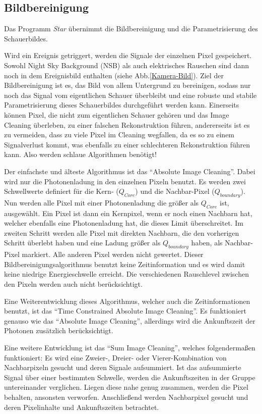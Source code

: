 \subsection{Bildbereinigung}
Das Programm \textit{Star} übernimmt die Bildbereinigung und die Parametrisierung des Schauerbildes.

Wird ein Ereignis getriggert, werden die Signale der einzelnen Pixel gespeichert.
Sowohl Night Sky Background (NSB) als auch elektrisches Rauschen sind dann noch in dem Ereignisbild enthalten (siehe Abb.\ref{Kamera-Bild}).
Ziel der Bildbereinigung ist es, das Bild von allem Untergrund zu bereinigen, sodass nur noch das Signal vom eigentlichen Schauer überbleibt und eine robuste und stabile Parametrisierung dieses Schauerbildes durchgeführt werden kann.
Einerseits können Pixel, die nicht zum eigentlichen Schauer gehören und das Image Cleaning überleben, zu einer falschen Rekonstruktion führen, andererseits ist es zu vermeiden, dass zu viele Pixel im Cleaning wegfallen, da es so zu einem Signalverlust kommt, was ebenfalls zu einer schlechteren Rekonstruktion führen kann.
Also werden schlaue Algorithmen benötigt! 

Der einfachste und älteste Algorithmus ist das ``Absolute Image Cleaning''.
Dabei wird nur die Photonenladung in den einzelnen Pixeln benutzt.
Es werden zwei Schwellwerte definiert für die Kern- ($Q_{Core}$) und die Nachbar-Pixel ($Q_{boundary}$).
Nun werden alle Pixel mit einer Photonenladung die größer als $Q_{Core}$ ist, ausgewählt.
Ein Pixel ist dann ein Kernpixel, wenn er noch einen Nachbarn hat, welcher ebenfalls eine Photonenladung hat, die dieses Limit überschreitet.
Im zweiten Schritt werden alle Pixel mit direkten Nachbarn, die den vorherigen Schritt überlebt haben und eine Ladung größer als $Q_{boundary}$ haben, als Nachbar-Pixel markiert.
Alle anderen Pixel werden nicht gewertet.
Dieser Bildbereinigungsalgorithmus benutzt keine Zeitinformation und es wird damit keine niedrige Energieschwelle erreicht. 
Die verschiedenen Rauschlevel zwischen den Pixeln werden auch nicht berücksichtigt.

Eine Weiterentwicklung dieses Algorithmus, welcher auch die Zeitinformationen benutzt, ist das ``Time Constrained Absolute Image Cleaning''. 
Es funktioniert genauso wie das ``Absolute Image Cleaning'', allerdings wird die Ankunftszeit der Photonen zusätzlich berücksichtigt.

Eine weitere Entwicklung ist das ``Sum Image Cleaning'', welches folgendermaßen funktioniert:
Es wird eine Zweier-, Dreier- oder Vierer-Kombination von Nachbarpixeln gesucht und deren Signale aufsummiert.
Ist das aufsummierte Signal über einer bestimmten Schwelle, werden die Ankunftszeiten in der Gruppe untereinander verglichen. 
Liegen diese nahe genug zusammen, werden die Pixel behalten, ansonsten verworfen.
Anschließend werden Nachbarpixel gesucht und deren Pixelinhalte und Ankunftszeiten betrachtet.

